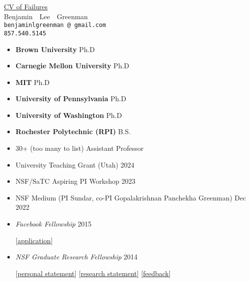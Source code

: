 \documentclass{article}
\makeatletter
\renewcommand{\maketitle}{
\begin{center}
  {\large{\href{https://www.princeton.edu/~joha/Johannes\_Haushofer\_CV\_of\_Failures.pdf}{CV of Failures}} \\
   \large{Benjamin~~Lee~~Greenman}}
\\\texttt{benjaminlgreenman\,@\,gmail.com}
\\\texttt{857.540.5145}
\end{center}
}
\makeatother
\begin{document}
\maketitle

{\centering{}}



\begin{itemize}
\item {\bf Brown University} \hfill Ph.D
\item {\bf Carnegie Mellon University} \hfill Ph.D
\item {\bf MIT} \hfill Ph.D
\item {\bf University of Pennsylvania} \hfill Ph.D
\item {\bf University of Washington} \hfill Ph.D
\item {\bf Rochester Polytechnic (RPI)} \hfill B.S.
\end{itemize}


\begin{itemize}
  \item 30+ (too many to list)  \hfill Assistant Professor
\end{itemize}


\begin{itemize}
\item University Teaching Grant (Utah) \hfill 2024
\item NSF/SaTC Aspiring PI Workshop \hfill 2023
\item NSF Medium (PI Sundar, co-PI Gopalakrishnan Panchekha Greenman) \hfill Dec 2022
\item \emph{Facebook Fellowship} \hfill 2015
\item[] [\href{http://cs.utah.edu/~blg/cv/failures/facebook-2015-reject.pdf}{application}]
\item \emph{NSF Graduate Research Fellowship} \hfill 2014
\item[] [\href{https://cs.utah.edu/~blg/cv/failures/nsf-2014-personal-reject.pdf}{personal statement}]
        [\href{https://cs.utah.edu/~blg/cv/failures/nsf-2014-research-reject.pdf}{research statement}]
        [\href{https://cs.utah.edu/~blg/cv/failures/nsf-2014-reject-response.pdf}{feedback}]
\end{itemize}
\end{document}

